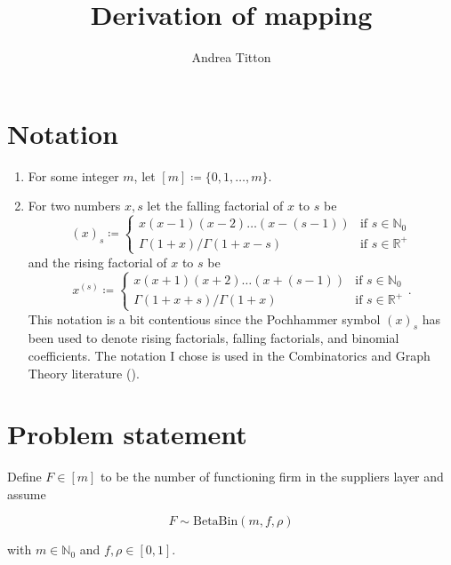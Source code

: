\documentclass[american, abstract=on]{scrartcl}
\author{Andrea Titton}
\title{Derivation of mapping}
\theoremstyle{plain}
\renewcommand{\Re}{\mathbb{R}}
\newcommand{\Beta}{\text{Beta}}
\newcommand{\Bin}{\text{Bin}}
\begin{document}
\maketitle

\section{Notation}

\begin{enumerate}
    \item For some integer $m$, let $[m] \coloneqq \{0, 1, \ldots, m\}$.
    \item For two numbers $x, s$ let the falling factorial of $x$ to $s$ be \begin{equation}
        (x)_s \coloneqq \begin{cases} x(x - 1)(x - 2)\ldots(x - (s - 1)) & \text{if } s \in \mathbb{N}_0 \\
       \Gamma(1 + x) \Big/ \Gamma(1 + x - s)& \text{if } s \in \Re^{+}
        \end{cases}
    \end{equation} and the rising factorial of $x$ to $s$ be \begin{equation}
        x^{(s)} \coloneqq \begin{cases} x(x + 1)(x + 2)\ldots(x + (s - 1)) & \text{if } s \in \mathbb{N}_0 \\
            \Gamma(1 + x + s) \Big/ \Gamma(1 + x)& \text{if } s \in \Re^{+}
             \end{cases}.
    \end{equation} This notation is a bit contentious since the Pochhammer symbol $(x)_s$ has been used to denote rising factorials, falling factorials, and binomial coefficients. The notation I chose is used in the Combinatorics and Graph Theory literature (\cite{harris_combinatorics_2008}).
\end{enumerate}

\section{Problem statement}

Define $F \in [m]$ to be the number of functioning firm in the suppliers layer and assume 

\begin{equation}
    F \sim \Beta\Bin(m, f, \rho)
\end{equation}

with $m \in \mathbb{N}_0$ and $f, \rho \in [0, 1]$.
\end{document}
